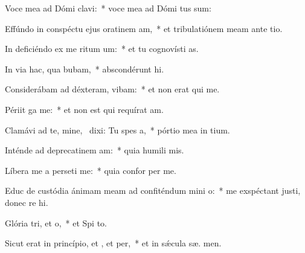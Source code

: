 \item Voce mea ad Dómi clavi:~* voce mea ad Dómi tus sum:
\item Effúndo in conspéctu ejus oratinem am,~* et tribulatiónem meam ante  tio.
\item In deficiéndo ex me ritum um:~* et tu cognovísti  as.
\item In via hac, qua bubam,~* abscondérunt  hi.
\item Considerábam ad déxteram,  vibam:~* et non erat qui  me.
\item Périit ga  me:~* et non est qui requírat  am.
\item Clamávi ad te, mine,~\pscross{} dixi: Tu  spes a,~* pórtio mea in  tium.
\item Inténde ad deprecatinem am:~* quia humili  mis.
\item Líbera me a perseti me:~* quia confor  per me.
\item Educ de custódia ánimam meam ad confiténdum mini o:~* me exspéctant justi, donec re hi.
\item Glória tri, et o,~* et Spi to.
\item Sicut erat in princípio, et , et per,~* et in sǽcula sæ. men.
